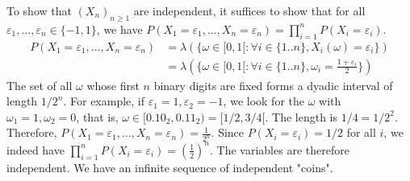 To show that $(X_n)_{n \geq 1}$ are independent, it suffices to show that for all $\varepsilon_1, \dots, \varepsilon_n \in \{-1, 1\}$, we have $P(X_1=\varepsilon_1, \dots, X_n=\varepsilon_n) = \prod_{i=1}^n P(X_i=\varepsilon_i)$.%
\begin{align*}
    P(X_1=\varepsilon_1, \dots, X_n=\varepsilon_n) &= \lambda(\{\omega \in [0,1[ : \forall i \in \{1..n\}, X_i(\omega)=\varepsilon_i\}) \\
    &= \lambda(\{\omega \in [0,1[ : \forall i \in \{1..n\}, \omega_i = \frac{1+\varepsilon_i}{2}\})
\end{align*}%
The set of all $\omega$ whose first $n$ binary digits are fixed forms a dyadic interval of length $1/2^n$. For example, if $\varepsilon_1=1, \varepsilon_2=-1$, we look for the $\omega$ with $\omega_1=1, \omega_2=0$, that is, $\omega \in [0.10_2, 0.11_2) = [1/2, 3/4[$. The length is $1/4 = 1/2^2$.
Therefore, $P(X_1=\varepsilon_1, \dots, X_n=\varepsilon_n) = \frac{1}{2^n}$.
Since $P(X_i=\varepsilon_i) = 1/2$ for all $i$, we indeed have $\prod_{i=1}^n P(X_i=\varepsilon_i) = (\frac{1}{2})^n$.
The variables are therefore independent. We have an infinite sequence of independent "coins".%
